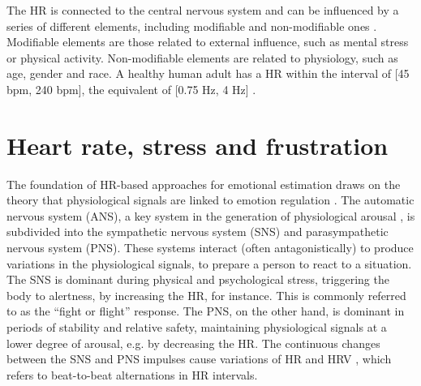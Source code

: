 The HR is connected to the central nervous system and can be influenced by a series of different elements, including modifiable and non-modifiable ones \parencite{valentini2009variables}. Modifiable elements are those related to external influence, such as mental stress or physical activity. Non-modifiable elements are related to physiology, such as age, gender and race. A healthy human adult has a HR within the interval of [45 bpm, 240 bpm], the equivalent of [0.75 Hz, 4 Hz] \parencite{li2014remote}.


%
%
%

\section{Heart rate, stress and frustration}

The foundation of HR-based approaches for emotional estimation draws on the theory that physiological signals are linked to emotion regulation \parencite{appelhans2006heart,fenton2012emotion,schubert2009effects}. The automatic nervous system (ANS), a key system in the generation of physiological arousal \parencite{appelhans2006heart}, is subdivided into the sympathetic nervous system (SNS) and parasympathetic nervous system (PNS). These systems interact (often antagonistically) to produce variations in the physiological signals, to prepare a person to react to a situation. The SNS is dominant during physical and psychological stress, triggering the body to alertness, by increasing the HR, for instance. This is commonly referred to as the ``fight or flight'' response. The PNS, on the other hand, is dominant in periods of stability and relative safety, maintaining physiological signals at a lower degree of arousal, e.g. by decreasing the HR. The continuous changes between the SNS and PNS impulses cause variations of HR and HRV \parencite{schubert2009effects}, which refers to beat-to-beat alternations in HR intervals.

